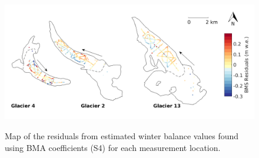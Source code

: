 \documentclass{sfuthesis}
\begin{document}
\begin{figure}[H]
	\centering
	\includegraphics[width =\textwidth]{residualsMap_BMS.png}\\
	\caption{Map of the residuals from estimated winter balance values found using BMA coefficients (S4) for each measurement location.}
	\label{fig:BMS_residualsMap}
\end{figure} 
\end{document}
